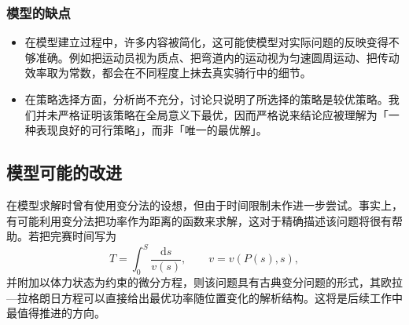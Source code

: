 \documentclass[11pt,a4paper]{ctexart}
\begin{document}
\subsubsection{模型的缺点}

\begin{itemize}
\item 在模型建立过程中，许多内容被简化，这可能使模型对实际问题的反映变得不够准确。例如把运动员视为质点、把弯道内的运动视为匀速圆周运动、把传动效率取为常数，都会在不同程度上抹去真实骑行中的细节。
\item 在策略选择方面，分析尚不充分，讨论只说明了所选择的策略是较优策略。我们并未严格证明该策略在全局意义下最优，因而严格说来结论应被理解为「一种表现良好的可行策略」，而非「唯一的最优解」。
\end{itemize}

\subsection{模型可能的改进}

在模型求解时曾有使用变分法的设想，但由于时间限制未作进一步尝试。事实上，有可能利用变分法把功率作为距离的函数来求解，这对于精确描述该问题将很有帮助。若把完赛时间写为
\[
T=\int_{0}^{S}\frac{\mathrm{d}s}{v\left(s\right)},\qquad v=v\left(P\left(s\right),s\right),
\]
并附加以体力状态为约束的微分方程，则该问题具有古典变分问题的形式，其欧拉—拉格朗日方程可以直接给出最优功率随位置变化的解析结构。这将是后续工作中最值得推进的方向。
\end{document}
